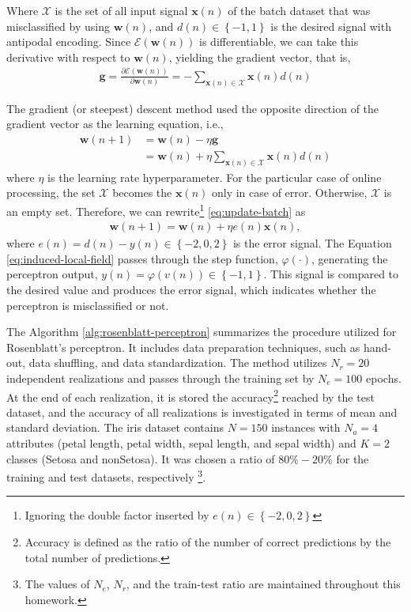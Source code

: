 \documentclass[12pt,a4paper]{article}
\begin{document}
Where \(\mathscr{X}\) is the set of all input signal \(\mathbf{x}(n)\) of the batch dataset that was misclassified by using \(\mathbf{w}(n)\), and \(d(n) \in \left\{ -1, 1 \right\}\) is the desired signal with antipodal encoding. Since \(\mathscr{E}\left( \mathbf{w} \left( n \right) \right)\) is differentiable, we can take this derivative with respect to \(\mathbf{w}(n)\), yielding the gradient vector, that is,
\begin{align}
    \mathbf{g} = \frac{\partial\mathscr{E} \left( \mathbf{w}(n) \right)}{\partial \mathbf{w}(n)} = - \sum_{\mathbf{x}(n) \in \mathscr{X}} \mathbf{x}(n) d(n)
\end{align}

The gradient (or steepest) descent method used the opposite direction of the gradient vector as the learning equation, i.e.,
\begin{align}
    \label{eq:update-batch}
    \mathbf{w}(n+1) & = \mathbf{w}(n) - \eta \mathbf{g} \\
                    & = \mathbf{w}(n) + \eta \sum_{\mathbf{x}(n) \in \mathscr{X}} \mathbf{x}(n) d(n)
\end{align}
where \(\eta\) is the learning rate hyperparameter. For the particular case of online processing, the set \(\mathscr{X}\) becomes the \(\mathbf{x}(n)\) only in case of error. Otherwise, \(\mathscr{X}\) is an empty set. Therefore, we can rewrite\footnote{Ignoring the double factor inserted by \(e(n) \in \left\{ -2,0,2 \right\}\)} \eqref{eq:update-batch} as
\begin{align}
    \mathbf{w}(n+1) = \mathbf{w}(n) + \eta e(n) \mathbf{x}(n),
\end{align}
where \(e(n) = d(n) - y(n) \in \left\{ -2, 0, 2 \right\}\) is the error signal.
The Equation \eqref{eq:induced-local-field} passes through the step function, \(\varphi \left( \cdot \right)\), generating the perceptron output, \(y\left( n \right) = \varphi(v\left( n \right)) \in \left\{ -1,1 \right\}\). This signal is compared to the desired value and produces the error signal, which indicates whether the perceptron is misclassified or not.

The Algorithm \ref{alg:rosenblatt-perceptron} summarizes the procedure utilized for Rosenblatt's perceptron. It includes data preparation techniques, such as hand-out, data shuffling, and data standardization. The method utilizes \(N_r=20\) independent realizations and passes through the training set by \(N_e=100\) epochs. At the end of each realization, it is stored the accuracy\footnote{Accuracy is defined as the ratio of the number of correct predictions by the total number of predictions.} reached by the test dataset, and the accuracy of all realizations is investigated in terms of mean and standard deviation. The iris dataset contains \(N=150\) instances with \(N_a=4\) attributes (petal length, petal width, sepal length, and sepal width) and \(K=2\) classes (Setosa and nonSetosa). It was chosen a ratio of \(80\%-20\%\) for the training and test datasets, respectively \footnote{The values of \(N_e\), \(N_r\), and the train-test ratio are maintained throughout this homework.}.
\end{document}
